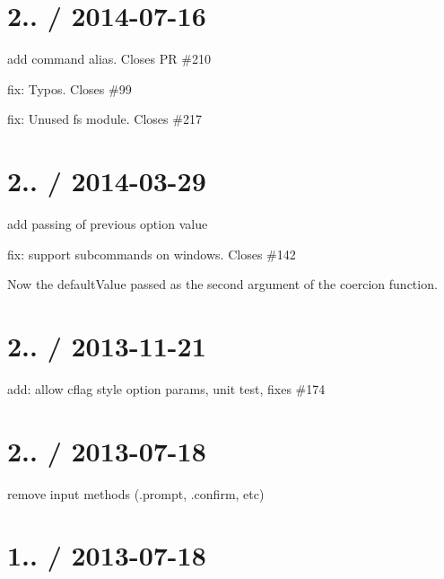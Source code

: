 \section*{2.. / 2014-\/07-\/16 }


\begin{DoxyItemize}
\item add command alias\textquotesingle{}. Closes PR \#210
\item fix\+: Typos. Closes \#99
\item fix\+: Unused fs module. Closes \#217
\end{DoxyItemize}

\section*{2.. / 2014-\/03-\/29 }


\begin{DoxyItemize}
\item add passing of previous option value
\item fix\+: support subcommands on windows. Closes \#142
\item Now the default\+Value passed as the second argument of the coercion function.
\end{DoxyItemize}

\section*{2.. / 2013-\/11-\/21 }


\begin{DoxyItemize}
\item add\+: allow cflag style option params, unit test, fixes \#174
\end{DoxyItemize}

\section*{2.. / 2013-\/07-\/18 }


\begin{DoxyItemize}
\item remove input methods (.prompt, .confirm, etc)
\end{DoxyItemize}

\section*{1.. / 2013-\/07-\/18 }


